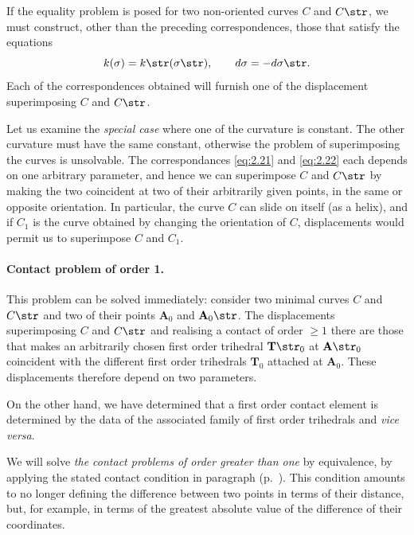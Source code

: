If the equality problem is posed for two non-oriented curves $C$ and $C\str$, we must construct, other than the preceding correspondences, those that satisfy the equations
\begin{equation}
  \label{eq:2.22}
  k(\sigma)=k\str(\sigma\str),\qquad d\sigma=-d\sigma\str.
\end{equation}
Each of the correspondences obtained will furnish one of the displacement superimposing $C$ and $C\str$.

Let us examine the \emph{special case} where one of the curvature is constant. The other curvature must have the same constant, otherwise the problem of superimposing the curves is unsolvable. The correspondances \eqref{eq:2.21} and \eqref{eq:2.22} each depends on one arbitrary parameter, and hence we can superimpose $C$ and $C\str$ by making the two coincident at two of their arbitrarily given points, in the same or opposite orientation. In particular, the curve $C$ can slide on itself (as a helix), and if $C_{1}$ is the curve obtained by changing the orientation of $C$, displacements would permit us to superimpose $C$ and $C_{1}$.

\paragraph{Contact problem of order 1.}
\label{sec:32}
This problem can be solved immediately: consider two minimal curves $C$ and $C\str$ and two of their points $\mathbf{A}_{0}$ and $\mathbf{A}_{0}\str$. The displacements superimposing $C$ and $C\str$ and realising a contact of order $\ge 1$ there are those that makes an arbitrarily chosen first order trihedral $\mathbf{T}\str_{0}$ at $\mathbf{A}\str_{0}$ coincident with the different first order trihedrals $\mathbf{T}_{0}$ attached at $\mathbf{A}_{0}$. These displacements therefore depend on two parameters.

On the other hand, we have determined that a first order contact element is determined by the data of the associated family of first order trihedrals and \emph{vice versa}.

We will solve \emph{the contact problems of order greater than one} by equivalence, by applying the stated contact condition in paragraph  (p.~\pageref{sec:16}). This condition amounts to no longer defining the difference between two points in terms of their distance, but, for example, in terms of the greatest absolute value of the difference of their coordinates.

